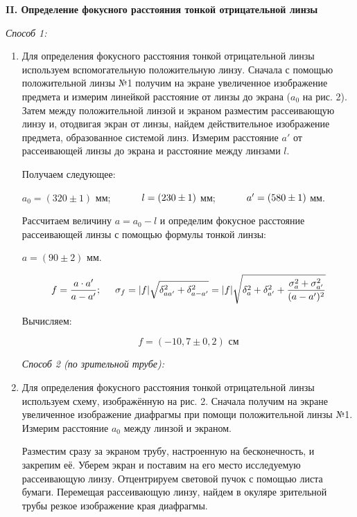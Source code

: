 \documentclass[a4paper,12pt]{article} %
\begin{document}
	\begin{center}
		\textbf{II. Определение фокусного расстояния тонкой отрицательной линзы}
	\end{center}
	\textit{Способ 1:} 
	\begin{enumerate}
		\item Для определения фокусного расстояния тонкой отрицательной линзы используем вспомогательную положительную линзу. Сначала с помощью положительной линзы №1 получим на экране увеличенное изображение предмета и измерим линейкой расстояние от линзы до экрана ($a_0$ на рис. 2). Затем между положительной линзой и экраном разместим рассеивающую линзу и, отодвигая экран от линзы, найдем действительное изображение предмета, образованное системой линз. Измерим расстояние $a'$ от рассеивающей линзы до экрана и расстояние между линзами $l$.
		
		Получаем следующее:
		
		$a_0 = (320 \pm 1)$ мм;	 $\hspace{10mm} l = (230 \pm 1)$ мм;  $\hspace{10mm} a' = (580 \pm 1)$ мм.
		
		
		Рассчитаем величину $a = a_0 - l$ и определим фокусное расстояние рассеивающей линзы с помощью формулы тонкой линзы:
		
		$a = (90 \pm 2)$ мм.
		
		\begin{equation*}
			f = \frac{a \cdot a'}{a - a'}; \hspace{5mm} \sigma_f = |f| \sqrt{\delta_{aa'}^2 + \delta_{a - a'}^2} = |f| \sqrt{\delta_a^2 + \delta_{a'}^2 + \frac{\sigma_a^2 + \sigma_{a'}^2}{(a - a')^2}}
		\end{equation*}
	
		Вычисляем:
		
		\begin{equation*}
			\boxed{f = (-10,7 \pm 0,2) \text{ см}}
		\end{equation*}
	
	\textit{Способ 2 (по зрительной трубе):}
	
	\item Для определения фокусного расстояния тонкой отрицательной линзы используем схему, изображённую на рис. 2. Сначала получим на экране увеличенное изображение диафрагмы при помощи положительной линзы №1. Измерим расстояние $a_0$ между линзой и экраном.
	
	Разместим сразу за экраном трубу, настроенную на бесконечность, и закрепим её. Уберем экран и поставим на его место исследуемую рассеивающую линзу. Отцентрируем световой пучок с помощью листа бумаги. Перемещая рассеивающую линзу, найдем в окуляре зрительной трубы резкое изображение края диафрагмы.
	

\end{enumerate}
\end{document}
